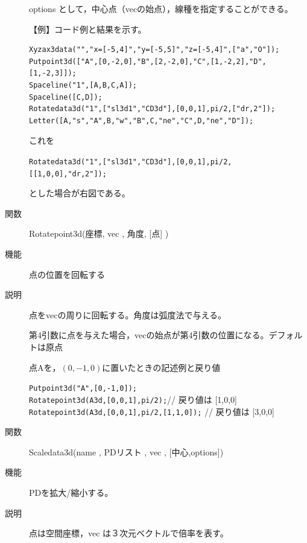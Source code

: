 \documentclass[papersize,a4paper,12pt,uplatex]{jsarticle}
\begin{document}
\begin{description}
options として，中心点（vecの始点），線種を指定することができる。

\vspace{\baselineskip}
【例】コード例と結果を示す。
\begin{verbatim}
Xyzax3data("","x=[-5,4]","y=[-5,5]","z=[-5,4]",["a","O"]);
Putpoint3d(["A",[0,-2,0],"B",[2,-2,0],"C",[1,-2,2],"D",[1,-2,3]]);
Spaceline("1",[A,B,C,A]);
Spaceline([C,D]);
Rotatedata3d("1",["sl3d1","CD3d"],[0,0,1],pi/2,["dr,2"]);
Letter([A,"s","A",B,"w","B",C,"ne","C",D,"ne","D"]);
\end{verbatim}
これを

\verb|Rotatedata3d("1",["sl3d1","CD3d"],[0,0,1],pi/2,[[1,0,0],"dr,2"]);|

とした場合が右図である。

  \hspace{5mm}  

\vspace{\baselineskip}
\hypertarget{rotatepoint3d}{}
\item[関数]Rotatepoint3d(座標, vec , 角度, [点] )
\item[機能]点の位置を回転する
\item[説明]点をvecの周りに回転する。角度は弧度法で与える。

第4引数に点を与えた場合，vecの始点が第4引数の位置になる。デフォルトは原点

点Aを，$(0,-1,0)$に置いたときの記述例と戻り値
 
\verb|Putpoint3d("A",[0,-1,0]);| \\
\verb|Rotatepoint3d(A3d,[0,0,1],pi/2);|// 戻り値は [1,0,0]\\
\verb|Rotatepoint3d(A3d,[0,0,1],pi/2,[1,1,0]);| // 戻り値は [3,0,0]\\

\vspace{\baselineskip}
\hypertarget{scaledata3d}{}
\item[関数]Scaledata3d(name , PDリスト , vec , [中心,options])
\item[機能]PDを拡大/縮小する。
\item[説明]点は空間座標，vec は３次元ベクトルで倍率を表す。


\end{description}
\end{document}
